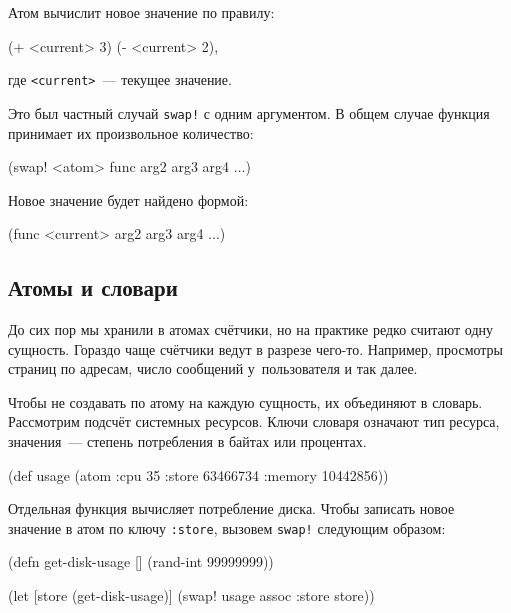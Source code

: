 Атом вычислит новое значение по правилу:

\begin{english}
  \begin{clojure}
(+ <current> 3)
(- <current> 2),
  \end{clojure}
\end{english}

\noindent
где \verb|<current>|~--- текущее значение.

Это был частный случай \verb|swap!| с одним аргументом. В общем случае функция
принимает их произвольное количество:

\begin{english}
  \begin{clojure}
(swap! <atom> func arg2 arg3 arg4 ...)
  \end{clojure}
\end{english}

\noindent
Новое значение будет найдено формой:

\begin{english}
  \begin{clojure}
(func <current> arg2 arg3 arg4 ...)
  \end{clojure}
\end{english}

\subsection{Атомы и словари}

До сих пор мы хранили в атомах счётчики, но на практике редко считают одну
сущность. Гораздо чаще счётчики ведут в разрезе чего-то. Например, просмотры
страниц по адресам, число сообщений у~пользователя и так далее.

Чтобы не создавать по атому на каждую сущность, их объединяют в
словарь. Рассмотрим подсчёт системных ресурсов. Ключи словаря означают тип
ресурса, значения~--- степень потребления в байтах или процентах.

\begin{english}
  \begin{clojure}
(def usage
  (atom {:cpu 35
         :store 63466734
         :memory 10442856}))
  \end{clojure}
\end{english}

Отдельная функция вычисляет потребление диска. Чтобы записать новое значение в
атом по ключу \verb|:store|, вызовем \verb|swap!| следующим образом:

\begin{english}
  \begin{clojure}
(defn get-disk-usage []
  (rand-int 99999999))

(let [store (get-disk-usage)]
  (swap! usage assoc :store store))
  \end{clojure}
\end{english}

